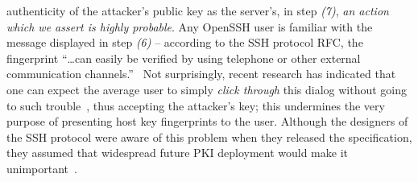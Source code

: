 authenticity of the attacker's public key as the server's, in step
\textit{(7)}, \emph{an action which we assert is highly probable}. Any
OpenSSH user is familiar with the message displayed in step
\textit{(6)} -- according to the SSH protocol RFC, the fingerprint
``\ldots can easily be verified by using telephone or other external
communication channels.''~\cite{rfc4251} Not surprisingly, recent
research has indicated that one can expect the average user to simply
\emph{click through} this dialog without going to such
trouble~\cite{adams-usability}, thus accepting the attacker's key;
this undermines the very purpose of presenting host key fingerprints
to the user. Although the designers of the SSH protocol were aware of
this problem when they released the specification, they assumed that
widespread future PKI deployment would make it
unimportant~\cite{rfc4251}.
